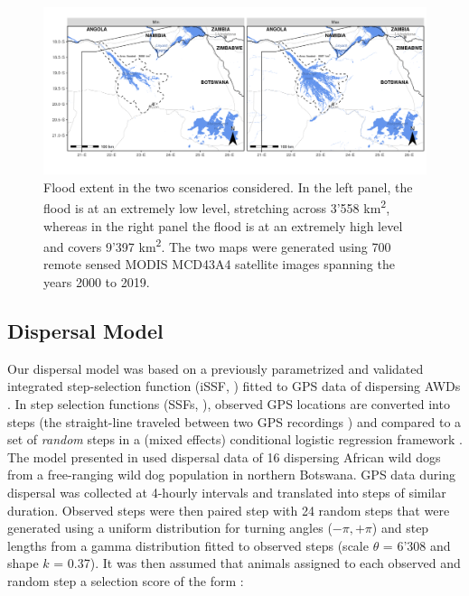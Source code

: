 \documentclass[abstract=on,10pt,a4paper,bibliography=totocnumbered]{article}
\begin{document}
\begin{figure}
  \begin{center}
  \includegraphics[width = \textwidth]{99_FloodExtent.png}
  \caption{Flood extent in the two scenarios considered. In the left panel, the
  flood is at an extremely low level, stretching across 3'558
  km\textsuperscript{2}, whereas in the right panel the flood is at an extremely
  high level and covers 9'397 km\textsuperscript{2}. The two maps were generated
  using 700 remote sensed MODIS MCD43A4 satellite images spanning the years 2000
  to 2019.}
  \label{FloodExtent}
  \end{center}
\end{figure}

\subsection{Dispersal Model}
Our dispersal model was based on a previously parametrized and validated
integrated step-selection function (iSSF, \citealp{Avgar.2016}) fitted to GPS
data of dispersing AWDs \citep{Hofmann.2023}. In step selection functions (SSFs,
\citealp{Fortin.2005}), observed GPS locations are converted into steps (the
straight-line traveled between two GPS recordings \citep{Turchin.1998a}) and
compared to a set of \textit{random} steps in a (mixed effects) conditional
logistic regression framework \citep{Fortin.2005, Thurfjell.2014, Muff.2020,
Fieberg.2021}. The model presented in \citep{Hofmann.2023} used dispersal data
of 16 dispersing African wild dogs from a free-ranging wild dog population in
northern Botswana. GPS data during dispersal was collected at 4-hourly intervals
and translated into steps of similar duration. Observed steps were then paired
step with 24 random steps that were generated using a uniform distribution for
turning angles (\(-\pi, +\pi\)) and step lengths from a gamma distribution
fitted to observed steps (scale \(\theta\) = 6'308 and shape \(k\) = 0.37). It
was then assumed that animals assigned to each observed and random step a
selection score of the form \citep{Fortin.2005}:
\end{document}
